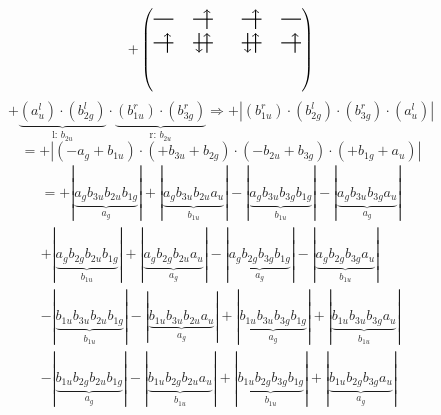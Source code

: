 \documentclass{article}
\begin{document}
\[+\left(\begin{tikzpicture}
    \draw[thick] (0,0) -- (0.5,0); %
    \draw[thick] (1,0) -- (1.5,0); %
    \draw[thick] (0,-0.6) -- (0.5,-0.6); %
    \draw[thick] (1,-0.6) -- (1.5,-0.6); %
\draw[->, thick] (1.35, -0.25) -- (1.35, 0.25); 
\draw[-> , thick] (0.35, -0.85) -- (0.35, -0.35); 
 \draw[-> , thick] (1.35, -0.85) -- (1.35, -0.35); 
\draw[<- , thick] (1.15, -0.85) -- (1.15, -0.35); 
\end{tikzpicture}\qquad \begin{tikzpicture}
    \draw[thick] (0,0) -- (0.5,0); %
    \draw[thick] (1,0) -- (1.5,0); %
    \draw[thick] (0,-0.6) -- (0.5,-0.6); %
    \draw[thick] (1,-0.6) -- (1.5,-0.6); %
\draw[->, thick] (0.35, -0.25) -- (0.35, 0.25); 
\draw[-> , thick] (0.35, -0.85) -- (0.35, -0.35); 
\draw[<- , thick] (0.15, -0.85) -- (0.15, -0.35); 
 \draw[-> , thick] (1.35, -0.85) -- (1.35, -0.35); 
\end{tikzpicture}\right)\]$$+ \underbrace{(a_{u}^{l})\cdot (b_{2g}^{l})}_{\text{l: }b_{2u}}\cdot \underbrace{(b_{1u}^{r})\cdot (b_{3g}^{r})}_{\text{r: }b_{2u}}\Rightarrow +\left|(b_{1u}^{r}) \cdot (b_{2g}^{l}) \cdot (b_{3g}^{r}) \cdot (a_{u}^{l})\right|$$$$=+\left|(-a_{g}+b_{1u}) \cdot (+b_{3u}+b_{2g}) \cdot (-b_{2u}+b_{3g}) \cdot (+b_{1g}+a_{u})\right|$$\begin{multline*}
=+\left|\underbrace{a_{g} b_{3u} b_{2u} b_{1g}}_{a_{g}}\right|+\left|\underbrace{a_{g} b_{3u} b_{2u} a_{u}}_{b_{1u}}\right|-\left|\underbrace{a_{g} b_{3u} b_{3g} b_{1g}}_{b_{1u}}\right|-\left|\underbrace{a_{g} b_{3u} b_{3g} a_{u}}_{a_{g}}\right|\\
+\left|\underbrace{a_{g} b_{2g} b_{2u} b_{1g}}_{b_{1u}}\right|+\left|\underbrace{a_{g} b_{2g} b_{2u} a_{u}}_{a_{g}}\right|-\left|\underbrace{a_{g} b_{2g} b_{3g} b_{1g}}_{a_{g}}\right|-\left|\underbrace{a_{g} b_{2g} b_{3g} a_{u}}_{b_{1u}}\right|\\
-\left|\underbrace{b_{1u} b_{3u} b_{2u} b_{1g}}_{b_{1u}}\right|-\left|\underbrace{b_{1u} b_{3u} b_{2u} a_{u}}_{a_{g}}\right|+\left|\underbrace{b_{1u} b_{3u} b_{3g} b_{1g}}_{a_{g}}\right|+\left|\underbrace{b_{1u} b_{3u} b_{3g} a_{u}}_{b_{1u}}\right|\\
-\left|\underbrace{b_{1u} b_{2g} b_{2u} b_{1g}}_{a_{g}}\right|-\left|\underbrace{b_{1u} b_{2g} b_{2u} a_{u}}_{b_{1u}}\right|+\left|\underbrace{b_{1u} b_{2g} b_{3g} b_{1g}}_{b_{1u}}\right|+\left|\underbrace{b_{1u} b_{2g} b_{3g} a_{u}}_{a_{g}}\right|

\end{multline*}
\end{document}
